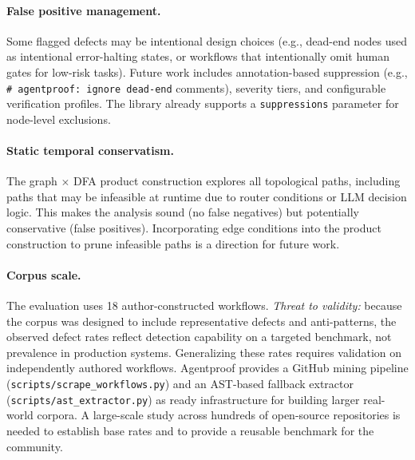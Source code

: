 \paragraph{False positive management.}
Some flagged defects may be intentional design choices (e.g., dead-end
nodes used as intentional error-halting states, or workflows that
intentionally omit human gates for low-risk tasks). Future work
includes annotation-based suppression (e.g.,
\texttt{\# agentproof: ignore dead-end} comments), severity tiers,
and configurable verification profiles. The library already supports
a \texttt{suppressions} parameter for node-level exclusions.

\paragraph{Static temporal conservatism.}
The graph $\times$ DFA product construction explores all topological
paths, including paths that may be infeasible at runtime due to router
conditions or LLM decision logic.  This makes the analysis sound
(no false negatives) but potentially conservative (false positives).
Incorporating edge conditions into the product construction to prune
infeasible paths is a direction for future work.

\paragraph{Corpus scale.}
The evaluation uses 18 author-constructed workflows.
\emph{Threat to validity:} because the corpus was designed to include
representative defects and anti-patterns, the observed defect rates
reflect detection capability on a targeted benchmark, not prevalence in
production systems. Generalizing these rates requires validation on
independently authored workflows.
Agentproof provides a GitHub mining pipeline
(\texttt{scripts/\allowbreak scrape\_workflows.py}) and an AST-based
fallback extractor (\texttt{scripts/\allowbreak ast\_extractor.py}) as
ready infrastructure for building larger real-world corpora. A
large-scale study across hundreds of open-source repositories is needed
to establish base rates and to provide a reusable benchmark for the
community.

